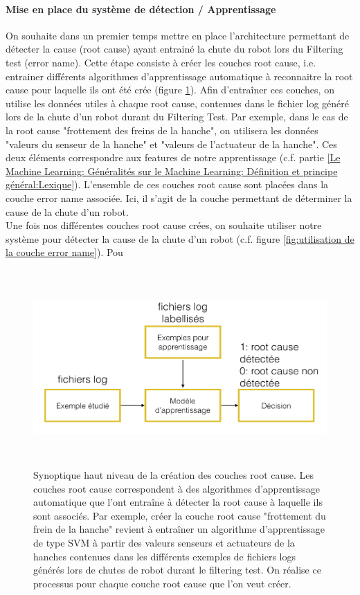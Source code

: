\paragraph{Mise en place du système de détection / Apprentissage}
On souhaite dans un premier temps mettre en place l'architecture permettant de détecter la cause (root cause) ayant entrainé la chute du robot lors du Filtering test (error name). Cette étape consiste à créer les couches root cause, i.e. entrainer différents algorithmes d'apprentissage automatique à reconnaitre la root cause pour laquelle ils ont été crée (figure \ref{fig:Creation des couche root cause}). Afin d'entraîner ces couches, on utilise les données utiles à chaque root cause, contenues dans le fichier log généré lors de la chute d'un robot durant du Filtering Test. Par exemple, dans le cas de la root cause "frottement des freins de la hanche", on utilisera les données "valeurs du senseur de la hanche" et "valeurs de l'actuateur de la hanche". Ces deux éléments correspondre aux features de notre apprentissage (c.f. partie \ref{Le Machine Learning: Généralités sur le Machine Learning: Définition et principe général:Lexique}). L'ensemble de ces couches root cause sont placées dans la couche error name associée. Ici, il s'agit de la couche permettant de déterminer la cause de la chute d'un robot. \\
Une fois nos différentes couches root cause crées, on souhaite utiliser notre système pour détecter la cause de la chute d'un robot (c.f. figure \ref{fig:utilisation de la couche error name}). Pou


\begin{figure}[h]
	\centering\includegraphics[height=7.5cm]{images/synoptique_root.png}
	\caption[Creation des couche root cause]{Synoptique haut niveau de la création des couches root cause. Les couches root cause correspondent à des algorithmes d'apprentissage automatique que l'ont entraîne à détecter la root cause à laquelle ils sont associés. Par exemple, créer la couche root cause "frottement du frein de la hanche" revient à entraîner un algorithme d'apprentissage de type SVM à partir des valeurs senseurs et actuateurs de la hanches contenues dans les différents exemples de fichiers logs générés lors de chutes de robot durant le filtering test. On réalise ce processus pour chaque couche root cause que l'on veut créer.}
	\label{fig:Creation des couche root cause}
\end{figure}

